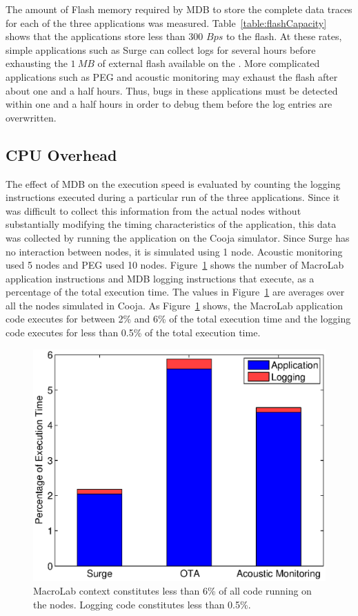 The amount of Flash memory required by MDB to store the complete data traces for
each of the three applications was measured.  Table~\ref{table:flashCapacity}
shows that the applications store less than 300 $Bps$ to the flash.  At these
rates, simple applications such as Surge can collect logs for several hours
before exhausting the $1 \ MB$ of external flash available on the \tmotesky.
More complicated applications such as PEG and acoustic monitoring may exhaust
the flash after about one and a half hours. Thus, bugs in these applications
must be detected within one and a half hours in order to debug them before the
log entries are overwritten.

\subsection{CPU Overhead} \label{CPUoverhead}

The effect of MDB on the execution speed is evaluated by counting the logging
instructions executed during a particular run of the three applications. Since
it was difficult to collect this information from the actual nodes without
substantially modifying the timing characteristics of the application, this data
was collected by running the application on the Cooja simulator. Since Surge has
no interaction between nodes, it is simulated using 1 node.  Acoustic monitoring
used 5 nodes and PEG used 10 nodes.  Figure~\ref{fig:execBreakdown} shows the
number of MacroLab application instructions and MDB logging instructions that
execute, as a percentage of the total execution time. The values in
Figure~\ref{fig:execBreakdown} are averages over all the nodes simulated in
Cooja. As Figure~\ref{fig:execBreakdown} shows, the MacroLab application code
executes for between 2\% and 6\% of the total execution time and the logging
code executes for less than 0.5\% of the total execution time.

\begin{figure}[t]
  \centering \includegraphics[width=0.6\columnwidth]{fig/execBreakdown}
  \caption[CPU Overhead]{MacroLab context constitutes less than 6\% of all code running on
      the nodes. Logging code constitutes less than 0.5\%.}
  \label{fig:execBreakdown}
\end{figure}

